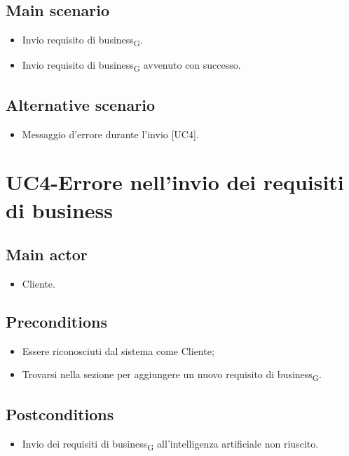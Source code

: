 \documentclass{article}
\begin{document}
     \subsection*{Main scenario}

        \begin{itemize}
            \item Invio requisito di business\textsubscript{G}.
            \item Invio requisito di business\textsubscript{G} avvenuto con successo.
        \end{itemize}
     \subsection*{Alternative scenario}
        \begin{itemize}
            \item Messaggio d'errore durante l'invio [UC4].
        \end{itemize}

\section{UC4-Errore nell'invio dei requisiti di business}

     \subsection*{Main actor}
     \begin{itemize}
         \item Cliente.
     \end{itemize}
     \subsection*{Preconditions} 
     \begin{itemize}
         \item Essere riconosciuti dal sistema come Cliente;
         \item Trovarsi nella sezione per aggiungere un nuovo requisito di business\textsubscript{G}.
     \end{itemize}
     \subsection*{Postconditions} 
        \begin{itemize}
            \item Invio dei requisiti di business\textsubscript{G} all'intelligenza artificiale non riuscito.
        \end{itemize}
\end{document}
